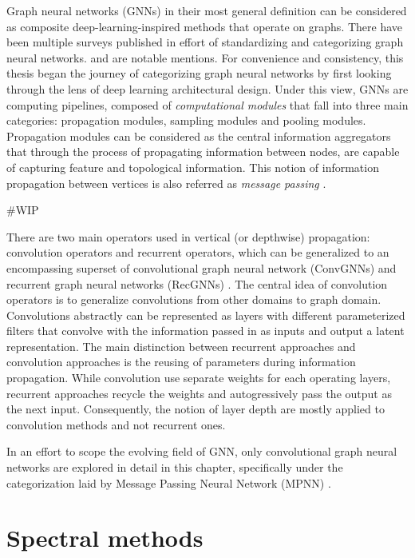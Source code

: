 Graph neural networks (GNNs) in their most general definition can be considered
as composite deep-learning-inspired methods that operate on graphs. There have
been multiple surveys published in effort of standardizing and categorizing
graph neural networks. \cite{zhangdeeplearninggraphs2020}
\cite{zhangdeeplearninggraphs2020} \cite{chamiMachineLearningGraphs2022} and
\cite{gilmerNeuralMessagePassing2017} are notable mentions. For convenience and
consistency, this thesis began the journey of categorizing graph neural networks
by first looking through the lens of deep learning architectural design. Under
this view, GNNs are computing pipelines, composed of \textit{computational
modules} that fall into three main categories: propagation modules, sampling
modules and pooling modules. Propagation modules can be considered as the
central information aggregators that through the process of propagating
information between nodes, are capable of capturing feature and topological
information. This notion of information propagation between vertices is also referred as
\textit{message passing} \cite{gilmerNeuralMessagePassing2017}.

\#WIP

There are two main operators used in vertical (or depthwise) propagation:
convolution operators and recurrent operators, which can be generalized to an
encompassing superset of convolutional graph neural network (ConvGNNs) and
recurrent graph neural networks (RecGNNs) \cite{wuComprehensiveSurveyGraph2021}.
The central idea of convolution operators is to generalize convolutions from
other domains to graph domain. Convolutions abstractly can be represented as
layers with different parameterized filters that convolve  with the information
passed in as inputs and output a latent representation. The main distinction
between recurrent approaches and convolution approaches is the reusing of
parameters during information propagation. While convolution use separate
weights for each operating layers, recurrent approaches recycle the weights and
autogressively pass the output as the next input. Consequently, the notion of
layer depth are mostly applied to convolution methods and not recurrent ones.

In an effort to scope the evolving field of GNN, only convolutional graph neural
networks are explored in detail in this chapter, specifically under the
categorization laid by Message Passing Neural Network (MPNN)
\cite{gilmerNeuralMessagePassing2017}.

\section{Spectral methods}
